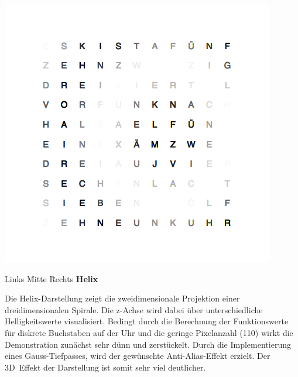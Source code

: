 \begin{multicols}{2}
{
    \centering
    \includegraphics[width=\columnwidth]{Abbildungen/Software/Demo/Welle}
}

\begin{tabbing}  
 Links \= Mitte \= Rechts \kill
 \> \textbf{Helix}
\end{tabbing}

Die Helix-Darstellung zeigt die zweidimensionale Projektion einer dreidimensionalen Spirale. Die z-Achse wird dabei über unterschiedliche Helligkeitswerte visualisiert. Bedingt durch die Berechnung der Funktionswerte für diskrete Buchstaben auf der Uhr und die geringe Pixelanzahl (110) wirkt die Demonstration zunächst sehr dünn und zerstückelt. Durch die Implementierung eines Gauss-Tiefpasses, wird der gewünschte Anti-Alias-Effekt erzielt. Der 3D~Effekt der Darstellung ist somit sehr viel deutlicher.


\end{multicols}
